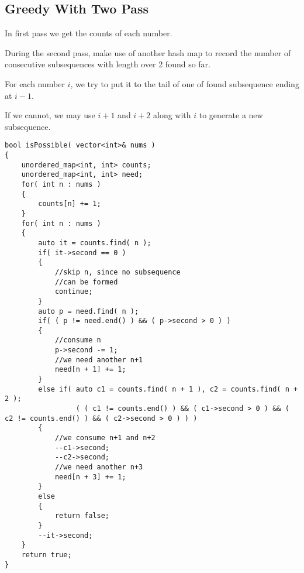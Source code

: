 \subsection{Greedy With Two Pass}
In first pass we get the counts of each number.

During the second pass, make use of another hash map to record the number of consecutive subsequences with length over 2 found so far.

For each number $i$, we try to put it to the tail of one of found subsequence ending at $i-1$. 

If we cannot, we may use $i+1$ and $i+2$ along with $i$ to generate a new subsequence. 

\begin{lstlisting}[style=customc, caption={Two Pass}]
bool isPossible( vector<int>& nums )
{
    unordered_map<int, int> counts;
    unordered_map<int, int> need;
    for( int n : nums )
    {
        counts[n] += 1;
    }
    for( int n : nums )
    {
        auto it = counts.find( n );
        if( it->second == 0 )
        {
            //skip n, since no subsequence
            //can be formed
            continue;
        }
        auto p = need.find( n );
        if( ( p != need.end() ) && ( p->second > 0 ) )
        {
            //consume n
            p->second -= 1;
            //we need another n+1
            need[n + 1] += 1;
        }
        else if( auto c1 = counts.find( n + 1 ), c2 = counts.find( n + 2 );
                 ( ( c1 != counts.end() ) && ( c1->second > 0 ) && ( c2 != counts.end() ) && ( c2->second > 0 ) ) )
        {
            //we consume n+1 and n+2
            --c1->second;
            --c2->second;
            //we need another n+3
            need[n + 3] += 1;
        }
        else
        {
            return false;
        }
        --it->second;
    }
    return true;
}
\end{lstlisting}